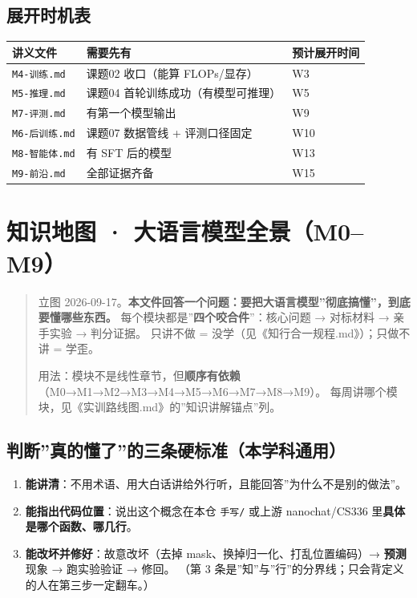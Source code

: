 \documentclass[
  chinese,
  11pt,
]{ctexart}
\newcounter{none} %
\providecommand{\tightlist}{%
  \setlength{\itemsep}{0pt}\setlength{\parskip}{0pt}}
\begin{document}
\subsection{展开时机表}\label{ux5c55ux5f00ux65f6ux673aux8868}

{\def\LTcaptype{none} %
\begin{longtable}[]{@{}lll@{}}
\toprule\noalign{}
讲义文件 & 需要先有 & 预计展开时间 \\
\midrule\noalign{}
\endhead
\bottomrule\noalign{}
\endlastfoot
\texttt{M4-训练.md} & 课题02 收口（能算 FLOPs/显存） & W3 \\
\texttt{M5-推理.md} & 课题04 首轮训练成功（有模型可推理） & W5 \\
\texttt{M7-评测.md} & 有第一个模型输出 & W9 \\
\texttt{M6-后训练.md} & 课题07 数据管线 + 评测口径固定 & W10 \\
\texttt{M8-智能体.md} & 有 SFT 后的模型 & W13 \\
\texttt{M9-前沿.md} & 全部证据齐备 & W15 \\
\end{longtable}
}

\newpage

\section{知识地图 · 大语言模型全景（M0--M9）}\label{ux77e5ux8bc6ux5730ux56fe-ux5927ux8bedux8a00ux6a21ux578bux5168ux666fm0m9}

\begin{quote}
立图 2026-09-17。\textbf{本文件回答一个问题：要把大语言模型''彻底搞懂''，到底要懂哪些东西。} 每个模块都是''\textbf{四个咬合件}''：核心问题 → 对标材料 → 亲手实验 → 判分证据。 只讲不做 = 没学（见《知行合一规程.md》）；只做不讲 = 学歪。

用法：模块不是线性章节，但\textbf{顺序有依赖}（M0→M1→M2→M3→M4→M5→M6→M7→M8→M9）。 每周讲哪个模块，见《实训路线图.md》的''知识讲解锚点''列。
\end{quote}

\subsection{判断''真的懂了''的三条硬标准（本学科通用）}\label{ux5224ux65adux771fux7684ux61c2ux4e86ux7684ux4e09ux6761ux786cux6807ux51c6ux672cux5b66ux79d1ux901aux7528}

\begin{enumerate}
\def\labelenumi{\arabic{enumi}.}
\tightlist
\item
  \textbf{能讲清}：不用术语、用大白话讲给外行听，且能回答''为什么不是别的做法''。
\item
  \textbf{能指出代码位置}：说出这个概念在本仓 \texttt{手写/} 或上游 nanochat/CS336 里\textbf{具体是哪个函数、哪几行}。
\item
  \textbf{能改坏并修好}：故意改坏（去掉 mask、换掉归一化、打乱位置编码）→ \textbf{预测}现象 → 跑实验验证 → 修回。 （第 3 条是''知''与''行''的分界线；只会背定义的人在第三步一定翻车。）
\end{enumerate}
\end{document}
